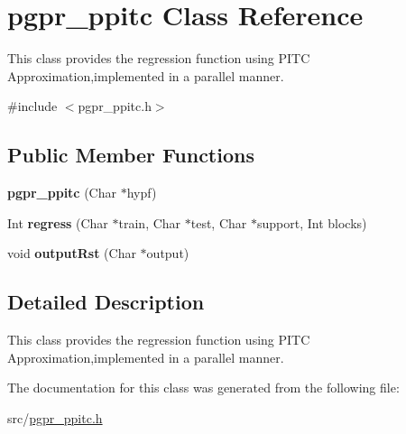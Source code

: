 \hypertarget{classpgpr__ppitc}{\section{pgpr\+\_\+ppitc Class Reference}
\label{classpgpr__ppitc}
}


This class provides the regression function using P\+I\+T\+C Approximation,implemented in a parallel manner.  




{\ttfamily \#include $<$pgpr\+\_\+ppitc.\+h$>$}

\subsection*{Public Member Functions}
\begin{DoxyCompactItemize}
\item 
\hypertarget{classpgpr__ppitc_a657669cbcb5919400802afeee866de17}{{\bfseries pgpr\+\_\+ppitc} (Char $\ast$hypf)}\label{classpgpr__ppitc_a657669cbcb5919400802afeee866de17}

\item 
\hypertarget{classpgpr__ppitc_aa72c1ee9f5004f7c97920793be7246dd}{Int {\bfseries regress} (Char $\ast$train, Char $\ast$test, Char $\ast$support, Int blocks)}\label{classpgpr__ppitc_aa72c1ee9f5004f7c97920793be7246dd}

\item 
\hypertarget{classpgpr__ppitc_ad00170745bce09f304adffbfe5d09cd2}{void {\bfseries output\+Rst} (Char $\ast$output)}\label{classpgpr__ppitc_ad00170745bce09f304adffbfe5d09cd2}

\end{DoxyCompactItemize}


\subsection{Detailed Description}
This class provides the regression function using P\+I\+T\+C Approximation,implemented in a parallel manner. 

The documentation for this class was generated from the following file\+:\begin{DoxyCompactItemize}
\item 
src/\hyperlink{pgpr__ppitc_8h}{pgpr\+\_\+ppitc.\+h}\end{DoxyCompactItemize}
